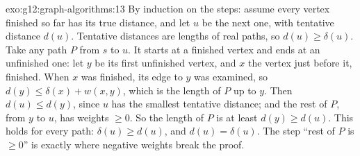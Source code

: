 \begin{solution}{exo:g12:graph-algorithms:13}
By induction on the steps: assume every vertex finished so far has its true distance, and let $u$ be the next one,
with tentative distance $d(u)$. Tentative distances are lengths of real paths, so $d(u) \ge \delta(u)$. Take any path
$P$ from $s$ to $u$. It starts at a finished vertex and ends at an unfinished one: let $y$ be its first unfinished
vertex, and $x$ the vertex just before it, finished. When $x$ was finished, its edge to $y$ was examined, so
$d(y) \le \delta(x) + w(x, y)$, which is the length of $P$ up to $y$. Then $d(u) \le d(y)$, since $u$ has the smallest
tentative distance; and the rest of $P$, from $y$ to $u$, has weights $\ge 0$. So the length of $P$ is at least
$d(y) \ge d(u)$. This holds for every path: $\delta(u) \ge d(u)$, and $d(u) = \delta(u)$. The step ``rest of $P$ is
$\ge 0$'' is exactly where negative weights break the proof.
\end{solution}

